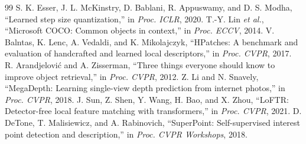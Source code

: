 \documentclass[10pt,conference]{IEEEtran}
\begin{document}
\begin{thebibliography}{99}
 S. K. Esser, J. L. McKinstry, D. Bablani, R. Appuswamy, and D. S. Modha, ``Learned step size quantization,'' in \emph{Proc. ICLR}, 2020.
 T.-Y. Lin \emph{et al.}, ``Microsoft COCO: Common objects in context,'' in \emph{Proc. ECCV}, 2014.
 V. Balntas, K. Lenc, A. Vedaldi, and K. Mikolajczyk, ``HPatches: A benchmark and evaluation of handcrafted and learned local descriptors,'' in \emph{Proc. CVPR}, 2017.
 R. Arandjelovi\'c and A. Zisserman, ``Three things everyone should know to improve object retrieval,'' in \emph{Proc. CVPR}, 2012.
 Z. Li and N. Snavely, ``MegaDepth: Learning single-view depth prediction from internet photos,'' in \emph{Proc. CVPR}, 2018.
 J. Sun, Z. Shen, Y. Wang, H. Bao, and X. Zhou, ``LoFTR: Detector-free local feature matching with transformers,'' in \emph{Proc. CVPR}, 2021.
 D. DeTone, T. Malisiewicz, and A. Rabinovich, ``SuperPoint: Self-supervised interest point detection and description,'' in \emph{Proc. CVPR Workshops}, 2018.
\end{thebibliography}
\end{document}
